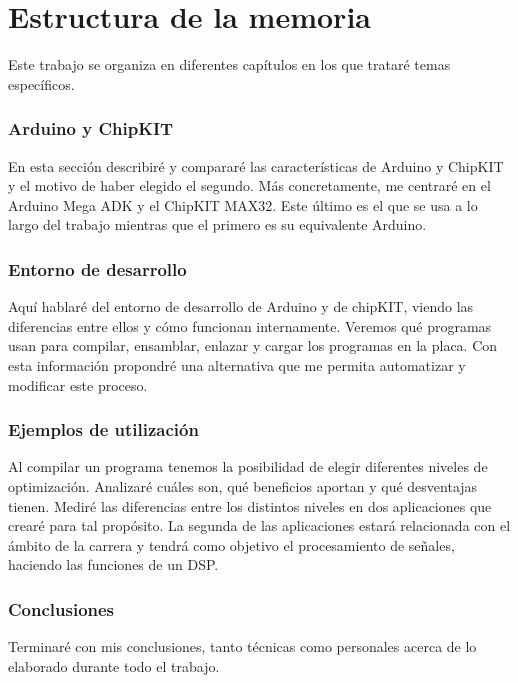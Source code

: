 \section{Estructura de la memoria}
Este trabajo se organiza en diferentes capítulos en los que trataré temas específicos.

\subsubsection{Arduino y ChipKIT}
En esta sección describiré y compararé las características de Arduino y ChipKIT y el motivo de haber elegido el segundo. Más concretamente, me centraré en el Arduino Mega ADK y el ChipKIT MAX32. Este último es el que se usa a lo largo del trabajo mientras que el primero es su equivalente Arduino.

\subsubsection{Entorno de desarrollo}
Aquí hablaré del entorno de desarrollo de Arduino y de chipKIT, viendo las diferencias entre ellos y cómo funcionan internamente. Veremos qué programas usan para compilar, ensamblar, enlazar y cargar los programas en la placa. Con esta información propondré una alternativa que me permita automatizar y modificar este proceso.

\subsubsection{Ejemplos de utilización}
Al compilar un programa tenemos la posibilidad de elegir diferentes niveles de optimización. Analizaré cuáles son, qué beneficios aportan y qué desventajas tienen. Mediré las diferencias entre los distintos niveles en dos aplicaciones que crearé para tal propósito. La segunda de las aplicaciones estará relacionada con el ámbito de la carrera y tendrá como objetivo el procesamiento de señales, haciendo las funciones de un DSP.

\subsubsection{Conclusiones}
Terminaré con mis conclusiones, tanto técnicas como personales acerca de lo elaborado durante todo el trabajo.
